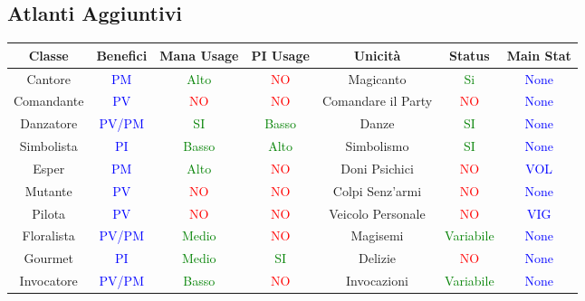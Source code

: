 \documentclass{article}
\begin{document}
\subsection{Atlanti Aggiuntivi}
  \begin{table}[h]
    \center
    \begin{tabular}{|c|c|c|c|c|c|c|}
      \hline
      \textbf{Classe} & \textbf{Benefici} & \textbf{Mana Usage} & \textbf{PI Usage}  & \textbf{Unicità} & \textbf{Status} & \textbf{Main Stat}\\
      \hline
      \centering Cantore  & \textcolor{blue}{PM}   & \textcolor{green}{Alto} & \textcolor{red}{NO} & Magicanto & \textcolor{green}{Si} &\textcolor{blue}{None} \\
      \hline
      \centering Comandante  & \textcolor{blue}{PV}   & \textcolor{red}{NO} & \textcolor{red}{NO} & Comandare il Party & \textcolor{red}{NO} &\textcolor{blue}{None} \\
      \hline
      \centering Danzatore & \textcolor{blue}{PV/PM}   & \textcolor{green}{SI} & \textcolor{green}{Basso} & Danze & \textcolor{green}{SI} &\textcolor{blue}{None} \\
      \hline
      \centering Simbolista& \textcolor{blue}{PI}   & \textcolor{green}{Basso} & \textcolor{green}{Alto} & Simbolismo & \textcolor{green}{SI} &\textcolor{blue}{None} \\
      \hline
      \centering Esper  & \textcolor{blue}{PM}   & \textcolor{green}{Alto} & \textcolor{red}{NO} & Doni Psichici & \textcolor{red}{NO} &\textcolor{blue}{VOL} \\
      \hline
      \centering Mutante  & \textcolor{blue}{PV}   & \textcolor{red}{NO} & \textcolor{red}{NO} & Colpi Senz'armi & \textcolor{red}{NO} &\textcolor{blue}{None} \\
      \hline
      \centering Pilota & \textcolor{blue}{PV}   & \textcolor{red}{NO} & \textcolor{red}{NO} & Veicolo Personale & \textcolor{red}{NO} &\textcolor{blue}{VIG} \\
      \hline
      \centering Floralista& \textcolor{blue}{PV/PM}   & \textcolor{green}{Medio} & \textcolor{red}{NO} & Magisemi & \textcolor{green}{Variabile} &\textcolor{blue}{None} \\
      \hline
      \centering Gourmet  & \textcolor{blue}{PI}   & \textcolor{green}{Medio} & \textcolor{green}{SI} & Delizie & \textcolor{red}{NO} &\textcolor{blue}{None} \\
      \hline
      \centering Invocatore  & \textcolor{blue}{PV/PM}   & \textcolor{green}{Basso} & \textcolor{red}{NO} & Invocazioni & \textcolor{green}{Variabile} &\textcolor{blue}{None} \\

\end{tabular}
\end{table}
\end{document}
